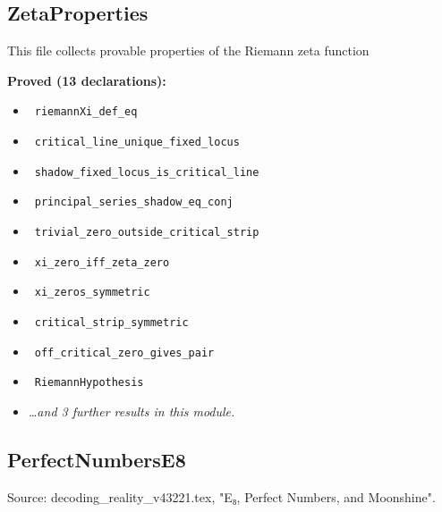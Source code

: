 \documentclass{report}
\theoremstyle{definition}
\begin{document}
\begin{itemize}
\begin{itemize}
\subsection{ZetaProperties}
This file collects provable properties of the Riemann zeta function

\noindent\textbf{Proved (13 declarations):}
\begin{itemize}
  \item {}\leanok\ \texttt{riemannXi\_def\_eq}
  \item {}\leanok\ \texttt{critical\_line\_unique\_fixed\_locus}
  \item {}\leanok\ \texttt{shadow\_fixed\_locus\_is\_critical\_line}
  \item {}\leanok\ \texttt{principal\_series\_shadow\_eq\_conj}
  \item {}\leanok\ \texttt{trivial\_zero\_outside\_critical\_strip}
  \item {}\leanok\ \texttt{xi\_zero\_iff\_zeta\_zero}
  \item {}\leanok\ \texttt{xi\_zeros\_symmetric}
  \item {}\leanok\ \texttt{critical\_strip\_symmetric}
  \item {}\leanok\ \texttt{off\_critical\_zero\_gives\_pair}
  \item {}\leanok\ \texttt{RiemannHypothesis}
  \item \emph{\ldots and 3 further results in this module.}
\end{itemize}

\subsection{PerfectNumbersE8}
Source: decoding\_reality\_v43221.tex, "E₈, Perfect Numbers, and Moonshine".


\end{itemize}
\end{itemize}
\end{document}
